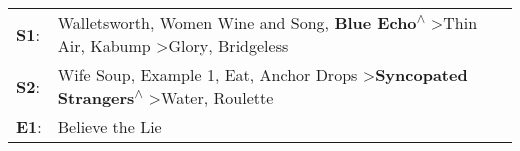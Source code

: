 \begin{supertabular}{p{0.03\textwidth}p{0.92\textwidth}}
 \textbf{S1}:  &  Walletsworth\textsuperscript{}, \enspace Women Wine and Song\textsuperscript{}, \enspace \textbf{Blue Echo\textsuperscript{$\wedge$}} \textgreater \enspace Thin Air\textsuperscript{}, \enspace Kabump\textsuperscript{} \textgreater \enspace Glory\textsuperscript{}, \enspace Bridgeless\textsuperscript{}  \enspace  \\
 \textbf{S2}:  &     Wife Soup\textsuperscript{}, \enspace Example 1\textsuperscript{}, \enspace Eat\textsuperscript{}, \enspace Anchor Drops\textsuperscript{} \textgreater \enspace \textbf{Syncopated Strangers\textsuperscript{$\wedge$}} \textgreater \enspace Water\textsuperscript{}, \enspace Roulette\textsuperscript{}  \enspace  \\
 \textbf{E1}:  &                                                                                                                                                                                                                                                                               Believe the Lie\textsuperscript{}  \enspace  \\
\end{supertabular}

